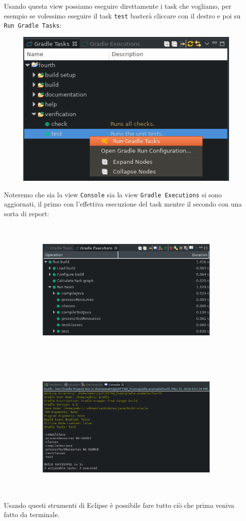 Usando questa view possiamo eseguire direttamente i task che vogliamo, per esempio se volessimo eseguire il task \texttt{test} basterà cliccare con il destro e poi su \texttt{Run Gradle Tasks}:
\begin{figure}[H]
    \centering
    \includegraphics[width=0.4\linewidth]{3DependencyManagement/eclipsePlugin/runTestTask.png}
\end{figure}
Noteremo che sia la view  \texttt{Console} sia la view \texttt{Gradle Executions} si sono aggiornati, il primo con l'effettiva esecuzione del task mentre il secondo con una sorta di report:
\begin{figure}[H]
\begin{subfigure}{0.5\textwidth}
\includegraphics[width=1.0\linewidth, height=7cm]{3DependencyManagement/eclipsePlugin/gradleExecutionsView.png}
\end{subfigure}
\begin{subfigure}{0.5\textwidth}
\includegraphics[width=1.1\linewidth, height=7cm]{3DependencyManagement/eclipsePlugin/consoleView.png}
\end{subfigure}
\end{figure}
Usando questi strumenti di Eclipse è possibile fare tutto ciò che prima veniva fatto da terminale.